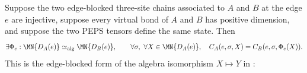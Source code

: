 \begin{theorem}%
    \label{thm:peps_edgeBlockedInsertionAlgebraIsomorphism}
    \leanok
    Suppose the two edge-blocked three-site chains associated to $A$ and $B$ at
    the edge $e$ are injective, suppose every virtual bond of $A$ and $B$ has
    positive dimension, and suppose the two PEPS tensors define the same state.
    Then
    \[
        \exists \Phi_e:\MN{D_A(e)}
        \simeq_{\mathrm{alg}}
        \MN{D_B(e)},\qquad
        \forall \sigma,\ \forall X\in\MN{D_A(e)},\quad
        C_A(e,\sigma,X)=C_B(e,\sigma,\Phi_e(X)).
    \]
    This is the edge-blocked form of the algebra isomorphism $X\mapsto Y$ in
    \cite[Section~3]{Molnar2018NormalPEPS}:
    \begin{center}
        \TNPEPSThreeSiteInsertionComparison
    \end{center}
\end{theorem}
